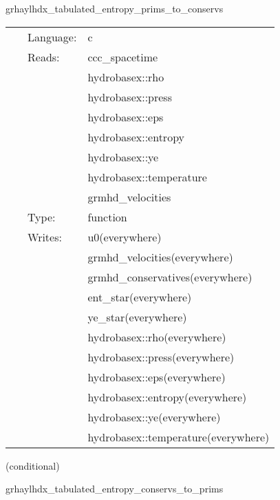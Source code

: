 \documentclass{article}
\begin{document}
\hspace{5mm} grhaylhdx\_tabulated\_entropy\_prims\_to\_conservs 

\hspace{5mm}{\it entropy+tabulated version of grhaylhdx\_prims\_to\_conservs } 


\hspace{5mm}

 \begin{tabular*}{160mm}{cll} 
~ & Language:  & c \\ 
~ & Reads:  & ccc\_spacetime \\ 
~& ~ &hydrobasex::rho\\ 
~& ~ &hydrobasex::press\\ 
~& ~ &hydrobasex::eps\\ 
~& ~ &hydrobasex::entropy\\ 
~& ~ &hydrobasex::ye\\ 
~& ~ &hydrobasex::temperature\\ 
~& ~ &grmhd\_velocities\\ 
~ & Type:  & function \\ 
~ & Writes:  & u0(everywhere) \\ 
~& ~ &grmhd\_velocities(everywhere)\\ 
~& ~ &grmhd\_conservatives(everywhere)\\ 
~& ~ &ent\_star(everywhere)\\ 
~& ~ &ye\_star(everywhere)\\ 
~& ~ &hydrobasex::rho(everywhere)\\ 
~& ~ &hydrobasex::press(everywhere)\\ 
~& ~ &hydrobasex::eps(everywhere)\\ 
~& ~ &hydrobasex::entropy(everywhere)\\ 
~& ~ &hydrobasex::ye(everywhere)\\ 
~& ~ &hydrobasex::temperature(everywhere)\\ 
\end{tabular*} 


\vspace{5mm}

   (conditional) 

\hspace{5mm} grhaylhdx\_tabulated\_entropy\_conservs\_to\_prims 

\hspace{5mm}{\it entropy+tabulated version of grhaylhdx\_conservs\_to\_prims } 
\end{document}
